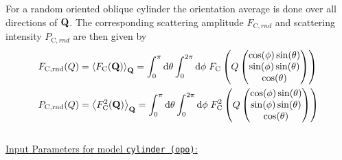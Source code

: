 For a random oriented oblique cylinder the orientation average is done over all directions of $\B{Q}$. The corresponding scattering amplitude $F_{\mathrm{C},rnd}$ and scattering intensity $P_{\mathrm{C},rnd}$ are then given by
\begin{align}
F_{\mathrm{C,rnd}}(Q) &= \left\langle F_\mathrm{C}(\B{Q})\right\rangle_\B{Q} = \int_0^\pi\mathrm{d}\theta \int_0^{2\pi}\mathrm{d}\phi \; F_\mathrm{C}\left(Q\begin{pmatrix}
                                       \cos(\phi)\sin(\theta) \\
                                       \sin(\phi)\sin(\theta) \\
                                       \cos(\theta)
                                     \end{pmatrix}\right) \\
P_{\mathrm{C,rnd}}(Q) &= \left\langle F_\mathrm{C}^2(\B{Q})\right\rangle_\B{Q} = \int_0^\pi\mathrm{d}\theta \int_0^{2\pi}\mathrm{d}\phi \; F_\mathrm{C}^2\left(Q\begin{pmatrix}
                                       \cos(\phi)\sin(\theta) \\
                                       \sin(\phi)\sin(\theta) \\
                                       \cos(\theta)
                                     \end{pmatrix}\right)
\end{align}
~\\
\underline{Input Parameters for model \texttt{cylinder (opo)}:}
